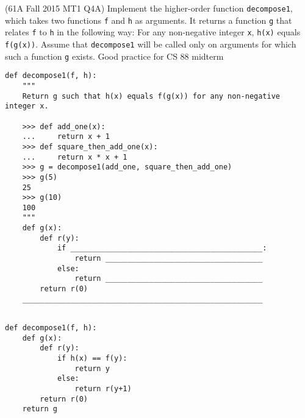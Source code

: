 \begin{blocksection}
\question (61A Fall 2015 MT1 Q4A) Implement the higher-order function \lstinline$decompose1$, 
which takes two functions \lstinline$f$ and \lstinline$h$ as arguments. It returns a function
\lstinline$g$ that relates \lstinline$f$ to \lstinline$h$ in the following way: For any 
non-negative integer \lstinline$x$, \lstinline$h(x)$ equals \lstinline$f(g(x))$. Assume that 
\lstinline$decompose1$ will be called only on arguments for which such a function 
\lstinline$g$ exists. Good practice for CS 88 midterm \\

\begin{lstlisting}
def decompose1(f, h):
    """
    Return g such that h(x) equals f(g(x)) for any non-negative integer x.
    
    >>> def add_one(x):
    ...     return x + 1
    >>> def square_then_add_one(x):
    ...     return x * x + 1
    >>> g = decompose1(add_one, square_then_add_one)
    >>> g(5)
    25
    >>> g(10)
    100
    """
    def g(x):
        def r(y):
            if ____________________________________________:
                return ____________________________________
            else:
                return ____________________________________
        return r(0)
    _______________________________________________________
    
\end{lstlisting}

\begin{solution}[1.5in]
\begin{lstlisting}
def decompose1(f, h):
    def g(x):
        def r(y):
            if h(x) == f(y):
                return y
            else:
                return r(y+1)
        return r(0)
    return g
\end{lstlisting}
\end{solution}
\end{blocksection}
